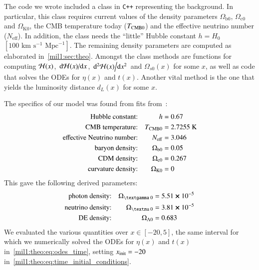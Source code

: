 


The code we wrote included a class in \verb|C++| representing the background. In particular, this class requires current values of the density parameters $\Omega_{\mathrm{b}0}$, $\Omega_{\mathrm{c}0}$ and $\Omega_{\mathrm{K}0}$, the CMB temperature today ($T_{\mathrm{CMB}0}$) and the effective neutrino number ($N_\mathrm{eff}$). In addition, the class needs the ``little'' Hubble constant $h=H_0$~$[100\text{~km}\text{~s}^{-1}\text{~Mpc}^{-1}]$. The remaining density parameters are computed as elaborated in~\cref{mil1:sec:theo}. Amongst the class methods are functions for computing $\mathcal{H}(x)$, $\dv*{\mathcal{H}(x)}{x}$, $\dv*[2]{\mathcal{H}(x)}{x}$ and $\Omega_{s0}(x)$ for some $x$, as well as code that solves the ODEs for $\eta(x)$ and $t(x)$. Another vital method is the one that yields the luminosity distance $d_L(x)$ for some $x$.


The specifics of our model was found from fits from~\citet{Planckdata}:
\begin{equation}\label{mil1:imp:eq:fiducials}
    \begin{split}
        \text{Hubble constant:}&& h &=0.67 \\
        \text{CMB temperature:}&& \TCMB &=2.7255\text{~K} \\
        \text{effective Neutrino number:}&& N\ped{eff}&=3.046\\
        \text{baryon density:}&& \Omega\ped{b 0}&=0.05\\
        \text{CDM density:}&& \Omega\ped{c 0}&=0.267\\
        \text{curvature density:}&& \OmgK&=0
    \end{split}
\end{equation}
This gave the following derived parameters:
\begin{equation}\label{mil1:imp:eq:derived_fiducials}
    \begin{split}
        \text{photon density:}&& \Omega\gped{\textgamma 0}&=5.51 \cross 10^{-5}\\
        \text{neutrino density:}&& \Omega\gped{\textnu 0}&=3.81 \cross 10^{-5}\\
        \text{DE density:}&& \OmgL&=0.683
    \end{split}
\end{equation}
We evaluated the various quantities over $x \in [-20, 5]$, the same interval for which we numerically solved the ODEs for $\eta(x)$ and $t(x)$ in~\cref{mil1:theo:eq:odes_time}, setting $x_\mathrm{init}=-20$ in~\cref{mil1:theo:eq:time_initial_conditions}. 


